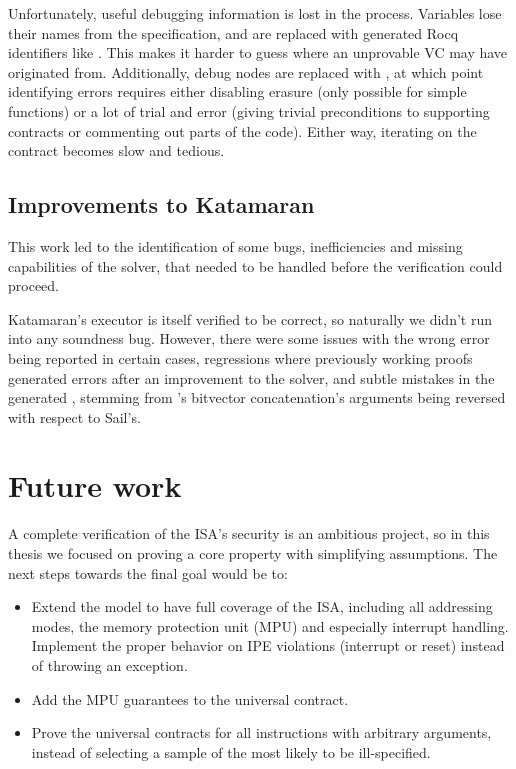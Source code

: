Unfortunately, useful debugging information is lost in the process. Variables lose their names from the \usail specification, and are replaced with generated Rocq identifiers like . This makes it harder to guess where an unprovable VC may have originated from. Additionally, debug nodes are replaced with , at which point identifying errors requires either disabling erasure (only possible for simple functions) or a lot of trial and error (\eg giving trivial preconditions to supporting contracts or commenting out parts of the code). Either way, iterating on the contract becomes slow and tedious.

\subsection{Improvements to Katamaran}

This work led to the identification of some bugs, inefficiencies and missing capabilities of the solver, that needed to be handled before the verification could proceed.

Katamaran's executor is itself verified to be correct, so naturally we didn't run into any soundness bug. However, there were some issues with the wrong error being reported in certain cases, regressions where previously working proofs generated errors after an improvement to the solver, and subtle mistakes in the generated \usail, stemming \eg from \usail's bitvector concatenation's arguments being reversed with respect to Sail's.






\section{Future work}

A complete verification of the \msp ISA's security is an ambitious project, so in this thesis we focused on proving a core property with simplifying assumptions. The next steps towards the final goal would be to:
\begin{itemize}
\item Extend the model to have full coverage of the \msp ISA, including all addressing modes, the memory protection unit (MPU) and especially interrupt handling. Implement the proper behavior on IPE violations (interrupt or reset) instead of throwing an exception.
\item Add the MPU guarantees to the universal contract.
\item Prove the universal contracts for all instructions with arbitrary arguments, instead of selecting a sample of the most likely to be ill-specified.
\end{itemize}

